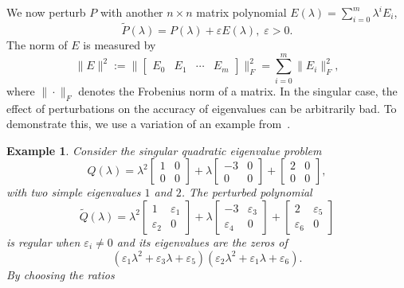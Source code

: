 \documentclass[12pt]{article}
\newtheorem{example}[theorem]{Example}
\begin{document}
We now perturb $P$ with another $n\times n$ matrix polynomial $E(\lambda) = \sum^m_{i=0}\lambda^iE_i$,
\begin{equation}\label{eq:pertPEP}
    \tilde{P}(\lambda) = P(\lambda)+\varepsilon E(\lambda),\;\varepsilon>0.
\end{equation}
The norm of $E$ is measured by
\[
    \|E\|^2 := \big\| \begin{bmatrix}
    E_0 & E_1 & \cdots &E_m
\end{bmatrix} \big\|_F^2 = \sum^m_{i=0}\|E_i\|^2_F,
\]
where $\|\cdot\|_F$ denotes the Frobenius norm of a matrix.
In the singular case, the effect of perturbations on the accuracy of eigenvalues can be arbitrarily bad. To demonstrate this, we use a variation of an example from~\cite{kaagstrom20008}.
\begin{example}
    Consider the singular quadratic eigenvalue problem
    \begin{equation*}
        Q(\lambda) = \lambda^2\begin{bmatrix}
            1 & 0\\
            0 & 0
        \end{bmatrix} + \lambda \begin{bmatrix}
            -3 & 0\\
            0 & 0
        \end{bmatrix} + \begin{bmatrix}
            2 & 0\\
            0 & 0
        \end{bmatrix},
    \end{equation*}
    with two simple eigenvalues $1$ and $2$. The perturbed polynomial
    \begin{equation*}
        \tilde{Q}(\lambda) = \lambda^2\begin{bmatrix}
            1 & \varepsilon_1\\
            \varepsilon_2 & 0
        \end{bmatrix} + \lambda \begin{bmatrix}
            -3 & \varepsilon_3\\
            \varepsilon_4 & 0
        \end{bmatrix} + \begin{bmatrix}
            2 & \varepsilon_5\\
            \varepsilon_6 & 0
        \end{bmatrix}
    \end{equation*}
    is regular when $\varepsilon_i \not = 0$ and its eigenvalues are the zeros of \[ (\varepsilon_1\lambda^2 + \varepsilon_3\lambda + \varepsilon_5)(\varepsilon_2\lambda^2+\varepsilon_1\lambda+\varepsilon_6).\] By choosing the ratios

\end{example}
\end{document}
